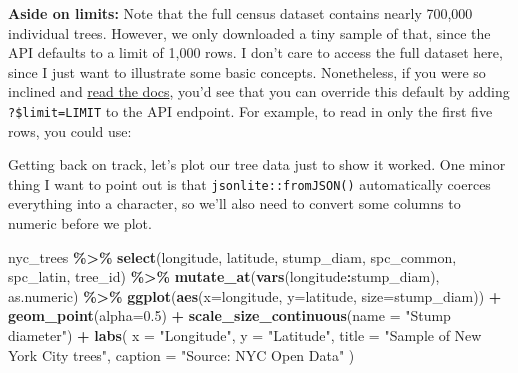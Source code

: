 \documentclass[
]{article}
\newenvironment{Shaded}{\begin{snugshade}}{\end{snugshade}}
\newcommand{\AttributeTok}[1]{\textcolor[rgb]{0.13,0.29,0.53}{#1}}
\newcommand{\DocumentationTok}[1]{\textcolor[rgb]{0.56,0.35,0.01}{\textbf{\textit{#1}}}}
\newcommand{\FloatTok}[1]{\textcolor[rgb]{0.00,0.00,0.81}{#1}}
\newcommand{\FunctionTok}[1]{\textcolor[rgb]{0.13,0.29,0.53}{\textbf{#1}}}
\newcommand{\NormalTok}[1]{#1}
\newcommand{\SpecialCharTok}[1]{\textcolor[rgb]{0.81,0.36,0.00}{\textbf{#1}}}
\newcommand{\StringTok}[1]{\textcolor[rgb]{0.31,0.60,0.02}{#1}}
\begin{document}
\textbf{Aside on limits:} Note that the full census dataset contains
nearly 700,000 individual trees. However, we only downloaded a tiny
sample of that, since the API defaults to a limit of 1,000 rows. I don't
care to access the full dataset here, since I just want to illustrate
some basic concepts. Nonetheless, if you were so inclined and
\href{https://dev.socrata.com/docs/queries/limit.html}{read the docs},
you'd see that you can override this default by adding
\texttt{?\$limit=LIMIT} to the API endpoint. For example, to read in
only the first five rows, you could use:

\begin{Shaded}
\end{Shaded}

Getting back on track, let's plot our tree data just to show it worked.
One minor thing I want to point out is that
\texttt{jsonlite::fromJSON()} automatically coerces everything into a
character, so we'll also need to convert some columns to numeric before
we plot.

\begin{Shaded}
\begin{Highlighting}[]
\NormalTok{nyc\_trees }\SpecialCharTok{\%\textgreater{}\%} 
  \FunctionTok{select}\NormalTok{(longitude, latitude, stump\_diam, spc\_common, spc\_latin, tree\_id) }\SpecialCharTok{\%\textgreater{}\%} 
  \FunctionTok{mutate\_at}\NormalTok{(}\FunctionTok{vars}\NormalTok{(longitude}\SpecialCharTok{:}\NormalTok{stump\_diam), as.numeric) }\SpecialCharTok{\%\textgreater{}\%} 
  \FunctionTok{ggplot}\NormalTok{(}\FunctionTok{aes}\NormalTok{(}\AttributeTok{x=}\NormalTok{longitude, }\AttributeTok{y=}\NormalTok{latitude, }\AttributeTok{size=}\NormalTok{stump\_diam)) }\SpecialCharTok{+} 
  \FunctionTok{geom\_point}\NormalTok{(}\AttributeTok{alpha=}\FloatTok{0.5}\NormalTok{) }\SpecialCharTok{+}
  \FunctionTok{scale\_size\_continuous}\NormalTok{(}\AttributeTok{name =} \StringTok{"Stump diameter"}\NormalTok{) }\SpecialCharTok{+}
  \FunctionTok{labs}\NormalTok{(}
    \AttributeTok{x =} \StringTok{"Longitude"}\NormalTok{, }\AttributeTok{y =} \StringTok{"Latitude"}\NormalTok{,}
    \AttributeTok{title =} \StringTok{"Sample of New York City trees"}\NormalTok{,}
    \AttributeTok{caption =} \StringTok{"Source: NYC Open Data"}
\NormalTok{    )}
\end{Highlighting}
\end{Shaded}
\end{document}
